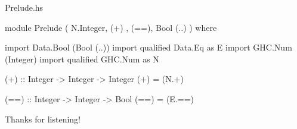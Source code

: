 \documentclass[UKenglish,usenames,dvipsnames,svgnames,table,aspectratio=169,mathserif]{beamer}
\begin{document}
\begin{frame}[fragile]

\begin{block}{Prelude.hs}
\begin{haskellcode}
module Prelude
  ( N.Integer, (+)
  , (==), Bool (..)
  )
where

import Data.Bool (Bool (..))
import qualified Data.Eq as E
import GHC.Num (Integer)
import qualified GHC.Num as N

(+) :: Integer -> Integer -> Integer
(+) = (N.+)

(==) :: Integer -> Integer -> Bool
(==) = (E.==)
\end{haskellcode}
\end{block}
\end{frame}






\begin{frame}
\huge \centering
Thanks for listening!
\end{frame}


\end{document}
